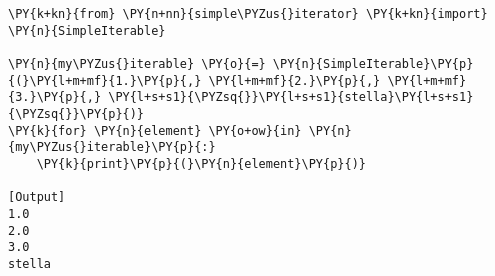 \begin{Verbatim}[label=\makebox{\url{https://bitbucket.org/lbaldini/programming/src/tip/snippets/test\_simple\_iterator.py}},commandchars=\\\{\}]
\PY{k+kn}{from} \PY{n+nn}{simple\PYZus{}iterator} \PY{k+kn}{import} \PY{n}{SimpleIterable}
   
\PY{n}{my\PYZus{}iterable} \PY{o}{=} \PY{n}{SimpleIterable}\PY{p}{(}\PY{l+m+mf}{1.}\PY{p}{,} \PY{l+m+mf}{2.}\PY{p}{,} \PY{l+m+mf}{3.}\PY{p}{,} \PY{l+s+s1}{\PYZsq{}}\PY{l+s+s1}{stella}\PY{l+s+s1}{\PYZsq{}}\PY{p}{)}
\PY{k}{for} \PY{n}{element} \PY{o+ow}{in} \PY{n}{my\PYZus{}iterable}\PY{p}{:}
    \PY{k}{print}\PY{p}{(}\PY{n}{element}\PY{p}{)}

[Output]
1.0
2.0
3.0
stella
\end{Verbatim}